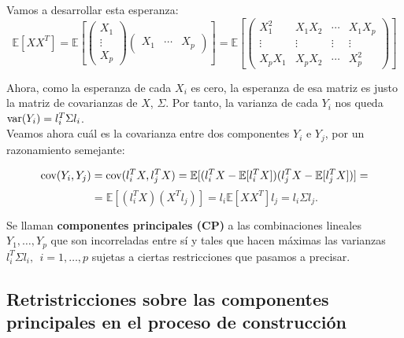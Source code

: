 Vamos a desarrollar esta esperanza:
\[	\mathbb{E}[XX^T] = \mathbb{E} \left[ \left( \begin{array}{c}
X_1 \\
\vdots \\
X_p \end{array} \right)
\left( \begin{array}{ccc}
X_1 & \cdots & X_p  \end{array} \right) \right] = 
\mathbb{E} \left[ \left( \begin{array}{cccc}
X_1^2 & X_1X_2 & \cdots & X_1X_p \\
\vdots & \vdots & \vdots & \vdots \\
X_pX_1 & X_pX_2 & \cdots & X_p^2 \end{array} \right) \right]
\]

Ahora, como la esperanza de cada $X_i$ es cero, la esperanza de esa matriz es justo la matriz de covarianzas de $X$, $\Sigma$. Por tanto, la varianza de cada $Y_i$ nos queda $\text{var}{(Y_i)} = l_i^T\Sigma l_i$.\\

Veamos ahora cuál es la covarianza entre dos componentes $Y_i$ e $Y_j$, por un razonamiento semejante:

\[ \text{cov}{(Y_i, Y_j)} = \text{cov}{(l_i^TX, l_j^TX)} = \mathbb{E}[(l_i^TX - \mathbb{E}[l_i^TX])(l_j^TX - \mathbb{E}[l_j^TX])] = \] 
\[ = \mathbb{E}[(l_i^TX)(X^Tl_j)] = l_i \mathbb{E}[XX^T] l_j = l_i \Sigma l_j.	\]

Se llaman \textbf{componentes principales (CP)} a las combinaciones lineales $Y_1, \dots, Y_p$ que son incorreladas entre sí y tales que hacen máximas las varianzas $l_i^T\Sigma l_i,\ \ i=1,\dots,p$ sujetas a ciertas restricciones que pasamos a precisar.

\subsection{Retristricciones sobre las componentes principales en el proceso de construcción}


